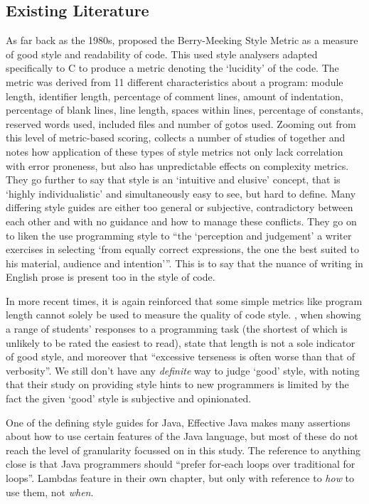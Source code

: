 \documentclass{article}
\begin{document}
    \subsection{Existing Literature}
        As far back as the 1980s, \cite{berryMeekingStyle} proposed the Berry-Meeking Style Metric as a measure of good style and readability of code. This used style analysers adapted specifically to C to produce a metric denoting the `lucidity' of the code. The metric was derived from 11 different characteristics about a program: module length, identifier length, percentage of comment lines, amount of indentation, percentage of blank lines, line length, spaces within lines, percentage of constants, reserved words used, included files and number of gotos used. Zooming out from this level of metric-based scoring, \cite{paradigmForStyleResearch} collects a number of studies of together and notes how application of these types of style metrics not only lack correlation with error proneness, but also has unpredictable effects on complexity metrics. They go further to say that style is an `intuitive and elusive' concept, that is `highly individualistic' and simultaneously easy to see, but hard to define. Many differing style guides are either too general or subjective, contradictory between each other and with no guidance and how to manage these conflicts. They go on to liken the use programming style to ``the `perception and judgement' a writer exercises in selecting `from equally correct expressions, the one the best suited to his material, audience and intention'{}''. This is to say that the nuance of writing in English prose is present too in the style of code.

        In more recent times, it is again reinforced that some simple metrics like program length cannot solely be used to measure the quality of code style. \cite{autoStyleFeedbackAtScale}, when showing a range of students' responses to a programming task (the shortest of which is unlikely to be rated the easiest to read), state that length is not a sole indicator of good style, and moreover that ``excessive terseness is often worse than that of verbosity''. We still don't have any \emph{definite} way to judge `good' style, with \cite{scaleDrivenHints} noting that their study on providing style hints to new programmers is limited by the fact the given `good' style is subjective and opinionated.

        One of the defining style guides for Java, Effective Java \citep{effectiveJava} makes many assertions about how to use certain features of the Java language, but most of these do not reach the level of granularity focussed on in this study. The reference to anything close is that Java programmers should ``prefer for-each loops over traditional for loops''. Lambdas feature in their own chapter, but only with reference to \emph{how} to use them, not \emph{when}.
\end{document}
